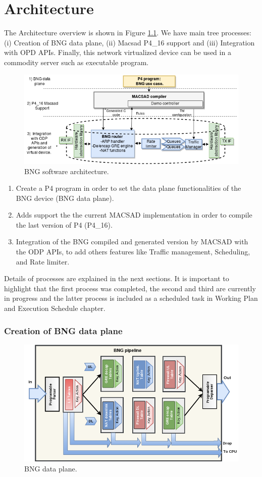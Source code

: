 \chapter{Architecture}
\label{cap:cap03}

The Architecture overview is shown in Figure \ref{fig:bng_arch}. We have main tree processes: (i) Creation of BNG data plane, (ii) Macsad P4\_16 support and (iii) Integration with OPD APIs. Finally, this network virtualized device can be used in a commodity server such as executable program.

\begin{figure}[ht]
	\centering
	\includegraphics[width=0.7\linewidth] {figures/bng_arch_0.png}
	\caption{BNG software architecture.}
	\label{fig:bng_arch}
\end{figure}


\begin{enumerate}
\item Create a P4 program in order to set the data plane functionalities of the BNG device (BNG data plane).   
\item Adds support the the current MACSAD implementation in order to compile the last version of P4 (P4\_16). 	
\item Integration of the BNG compiled and generated version by MACSAD with the ODP APIs, to add others features like Traffic management, Scheduling, and Rate limiter.

\end{enumerate}

Details of processes are explained in the next sections. It is important to highlight that the first process was completed, the second and third are currently in progress and the latter process is included as a scheduled task in Working Plan and Execution Schedule chapter.


\subsection{Creation of BNG data plane }
\label{ss:dataplane}
\begin{figure}[ht]
	\centering
	\includegraphics[width=0.7\linewidth] {figures/bng_pipe.png}
	\caption{BNG data plane.}
	\label{fig:bng_pipe}
\end{figure}

